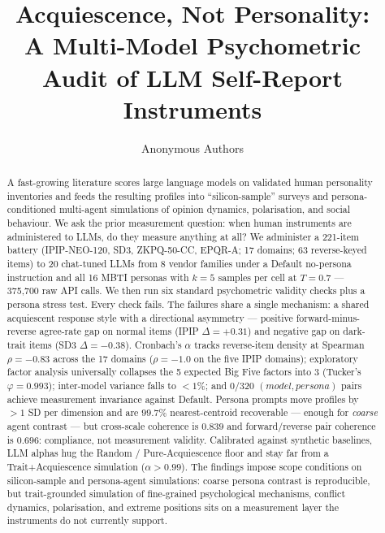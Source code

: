 \documentclass{article}
\title{Acquiescence, Not Personality: \\ A Multi-Model Psychometric Audit of LLM Self-Report Instruments}
\author{Anonymous Authors}
\begin{document}
\maketitle

\begin{abstract}
A fast-growing literature scores large language models on validated human personality inventories and feeds the resulting profiles into ``silicon-sample'' surveys and persona-conditioned multi-agent simulations of opinion dynamics, polarisation, and social behaviour. We ask the prior measurement question: when human instruments are administered to LLMs, do they measure anything at all? We administer a 221-item battery (IPIP-NEO-120, SD3, ZKPQ-50-CC, EPQR-A; 17 domains; 63 reverse-keyed items) to 20 chat-tuned LLMs from 8 vendor families under a Default no-persona instruction and all 16 MBTI personas with $k{=}5$ samples per cell at $T{=}0.7$ --- 375{,}700 raw API calls. We then run six standard psychometric validity checks plus a persona stress test. Every check fails. The failures share a single mechanism: a shared acquiescent response style with a directional asymmetry --- positive forward-minus-reverse agree-rate gap on normal items (IPIP $\Delta{=}{+}0.31$) and negative gap on dark-trait items (SD3 $\Delta{=}{-}0.38$). Cronbach's $\alpha$ tracks reverse-item density at Spearman $\rho{=}{-}0.83$ across the 17 domains ($\rho{=}{-}1.0$ on the five IPIP domains); exploratory factor analysis universally collapses the 5 expected Big Five factors into 3 (Tucker's $\varphi{=}0.993$); inter-model variance falls to ${<}1\%$; and $0/320$ $(model, persona)$ pairs achieve measurement invariance against Default. Persona prompts move profiles by ${>}1$ SD per dimension and are $99.7\%$ nearest-centroid recoverable --- enough for \emph{coarse} agent contrast --- but cross-scale coherence is $0.839$ and forward/reverse pair coherence is $0.696$: compliance, not measurement validity. Calibrated against synthetic baselines, LLM alphas hug the Random / Pure-Acquiescence floor and stay far from a Trait+Acquiescence simulation ($\alpha{>}0.99$). The findings impose scope conditions on silicon-sample and persona-agent simulations: coarse persona contrast is reproducible, but trait-grounded simulation of fine-grained psychological mechanisms, conflict dynamics, polarisation, and extreme positions sits on a measurement layer the instruments do not currently support.
\end{abstract}

\end{document}
